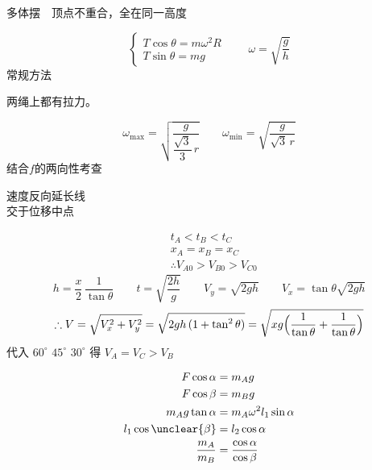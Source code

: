 
多体摆　顶点不重合，全在同一高度

\[
\left\{\begin{array}{l}
T\cos\theta=m\omega^2R\\
T\sin\theta=mg
\end{array}\right.
\qquad
\omega=\sqrt{\frac{g}{h}}
\]
常规方法

两绳上都有拉力。


\[
\omega_{\max}=\sqrt{\dfrac{g}{\dfrac{\sqrt3}{3}\,r}}
\qquad
\omega_{\min}=\sqrt{\dfrac{g}{\sqrt3\,r}}
\]
结合$f$的两向性考查
\begin{problem}[3、平抛]
速度反向延长线\\交于位移中点
\begin{solution}
\begin{align*}
&t_A<t_B<t_C\\
&x_A=x_B=x_C\\
&\therefore V_{A0}>V_{B0}>V_{C0}
\end{align*}
\[ h=\frac{x}{2}\,\frac{1}{\tan\theta}\qquad t=\sqrt{\frac{2h}{g}}\qquad V_y=\sqrt{2gh}\qquad V_x=\tan\theta\sqrt{2gh} \]
\[ \therefore V=\sqrt{V_x^2+V_y^2}=\sqrt{2gh\,(1+\tan^2\theta)}=\sqrt{xg\Bigl(\frac{1}{\tan\theta}+\frac{1}{\tan\theta}\Bigr)} \] %
代入 $60^\circ$ $45^\circ$ $30^\circ$ 得 $V_A=V_C>V_B$
\end{solution}
\end{problem}
\begin{problem}
\begin{solution}
\begin{align*}
F\cos\alpha&=m_Ag\\
F\cos\beta&=m_Bg\\
m_Ag\tan\alpha&=m_A\omega^2l_1\sin\alpha\\
l_1\cos\unclear{\beta}&=l_2\cos\alpha\\ %
\frac{m_A}{m_B}&=\frac{\cos\alpha}{\cos\beta}
\end{align*}
\end{solution}
\end{problem}
